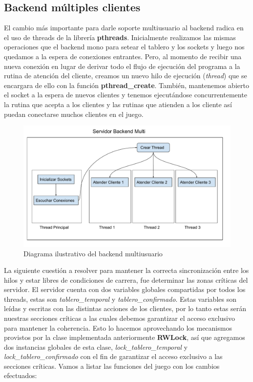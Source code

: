 \subsection{Backend múltiples clientes}

El cambio más importante para darle soporte multiusuario al backend radica en el uso de threads de la librería \textbf{pthreads}. Inicialmente realizamos las mismas operaciones que el backend mono para setear el tablero y los sockets y luego nos quedamos a la espera de conexiones entrantes. Pero, al momento de recibir una nueva conexión en lugar de derivar todo el flujo de ejecución del programa a la rutina de atención del cliente, creamos un nuevo hilo de ejecución (\textit{thread}) que se encargara de ello con la función \textbf{pthread\_create}. También, mantenemos abierto el socket a la espera de nuevos clientes y tenemos ejecutándose concurrentemente la rutina que acepta a los clientes y las rutinas que atienden a los cliente así puedan conectarse muchos clientes en el juego.

\begin{figure}[H]
  \begin{center}
	\includegraphics[scale = 0.4]{./imagenes/so_tp2_2.pdf}
	\caption{Diagrama ilustrativo del backend multiusuario}
	\label{fig:fig2}
  \end{center}
\end{figure}

La siguiente cuestión a resolver para mantener la correcta sincronización entre los hilos y estar libres de condiciones de carrera, fue determinar las zonas críticas del servidor. El servidor cuenta con dos variables globales compartidas por todos los threads, estas son \textit{tablero\_temporal} y \textit{tablero\_confirmado}. Estas variables son leídas y escritas con las distintas acciones de los clientes, por lo tanto estas serán nuestras secciones críticas a las cuales debemos garantizar el acceso exclusivo para mantener la coherencia. Esto lo hacemos aprovechando los mecanismos provistos por la clase implementada anteriormente \textbf{RWLock}, así que agregamos dos instancias globales de esta clase, \textit{lock\_tablero\_temporal} y \textit{lock\_tablero\_confirmado} con el fin de garantizar el acceso exclusivo a las secciones críticas. Vamos a listar las funciones del juego con los cambios efectuados:

